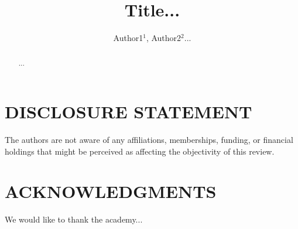 \documentclass{ar-1col}
\begin{document}

\title{Title...}

\author{Author1$^1$, Author2$^2$...
}

\begin{abstract}
  ...
\end{abstract}

\begin{keywords}
\end{keywords}

\maketitle

\tableofcontents



\section*{DISCLOSURE STATEMENT}
The authors are not aware of any affiliations, memberships, funding, or financial holdings that might be perceived as affecting the objectivity of this review. 

\section*{ACKNOWLEDGMENTS} %
We would like to thank the academy...




\end{document}
